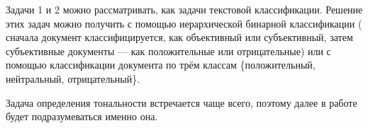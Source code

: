 Задачи 1 и 2 можно рассматривать, как задачи текстовой классификации. Решение 
этих задач можно получить с помощью иерархической бинарной классификации (
сначала документ классифицируется, как объективный или субъективный, затем 
субъективные документы --- как положительные или отрицательные) или с 
помощью классификации документа по трём классам \{положительный, 
нейтральный, отрицательный\}. 

Задача определения тональности встречается чаще всего, поэтому далее в работе 
будет подразумеваться именно она.